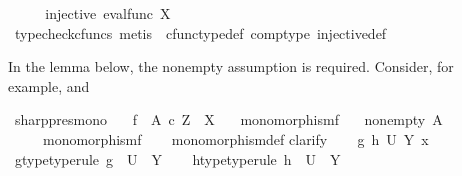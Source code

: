 \begin{isabellebody}
\ \ \isamarkupfalse%
\ \isamarkupfalse%
\ {\isachardoublequoteopen}injective\ {\isacharparenleft}{\kern0pt}eval{\isacharunderscore}{\kern0pt}func\ X\ {\isasymone}{\isacharparenright}{\kern0pt}{\isachardoublequoteclose}\isanewline
\ \ \ \ \isamarkupfalse%
\ {\isacharparenleft}{\kern0pt}typecheck{\isacharunderscore}{\kern0pt}cfuncs{\isacharcomma}{\kern0pt}\ metis\ \ cfunc{\isacharunderscore}{\kern0pt}type{\isacharunderscore}{\kern0pt}def\ comp{\isacharunderscore}{\kern0pt}type\ injective{\isacharunderscore}{\kern0pt}def{\isacharparenright}{\kern0pt}\isanewline
{}\isamarkupfalse%
%
\endisatagproof
{\isafoldproof}%
%
\isadelimproof
%
\endisadelimproof
%
\begin{isamarkuptext}%
In the lemma below, the nonempty assumption is required.
      Consider, for example,  and %
\end{isamarkuptext}\isamarkuptrue%
\isamarkupfalse%
\ sharp{\isacharunderscore}{\kern0pt}pres{\isacharunderscore}{\kern0pt}mono{\isacharcolon}{\kern0pt}\isanewline
\ \ \ {\isachardoublequoteopen}f\ {\isacharcolon}{\kern0pt}\ A\ {\isasymtimes}\isactrlsub c\ Z\ {\isasymrightarrow}\ X{\isachardoublequoteclose}\isanewline
\ \ \ {\isachardoublequoteopen}monomorphism{\isacharparenleft}{\kern0pt}f{\isacharparenright}{\kern0pt}{\isachardoublequoteclose}\isanewline
\ \ \ {\isachardoublequoteopen}nonempty\ A{\isachardoublequoteclose}\isanewline
\ \ \ \ \ {\isachardoublequoteopen}monomorphism{\isacharparenleft}{\kern0pt}f\isactrlsup {\isasymsharp}{\isacharparenright}{\kern0pt}{\isachardoublequoteclose}\isanewline
%
\isadelimproof
\ \ %
\endisadelimproof
%
\isatagproof
{}\isamarkupfalse%
\ monomorphism{\isacharunderscore}{\kern0pt}def{}\isanewline
{}\isamarkupfalse%
{\isacharparenleft}{\kern0pt}clarify{\isacharparenright}{\kern0pt}\isanewline
\ \ \isamarkupfalse%
\ g\ h\ U\ Y\ x\isanewline
\ \ \isamarkupfalse%
\ g{\isacharunderscore}{\kern0pt}type{\isacharbrackleft}{\kern0pt}type{\isacharunderscore}{\kern0pt}rule{\isacharbrackright}{\kern0pt}{\isacharcolon}{\kern0pt}\ {\isachardoublequoteopen}g\ {\isacharcolon}{\kern0pt}\ U\ {\isasymrightarrow}\ Y{\isachardoublequoteclose}\isanewline
\ \ \isamarkupfalse%
\ h{\isacharunderscore}{\kern0pt}type{\isacharbrackleft}{\kern0pt}type{\isacharunderscore}{\kern0pt}rule{\isacharbrackright}{\kern0pt}{\isacharcolon}{\kern0pt}\ {\isachardoublequoteopen}h\ {\isacharcolon}{\kern0pt}\ U\ {\isasymrightarrow}\ Y{\isachardoublequoteclose}\isanewline

\end{isabellebody}

